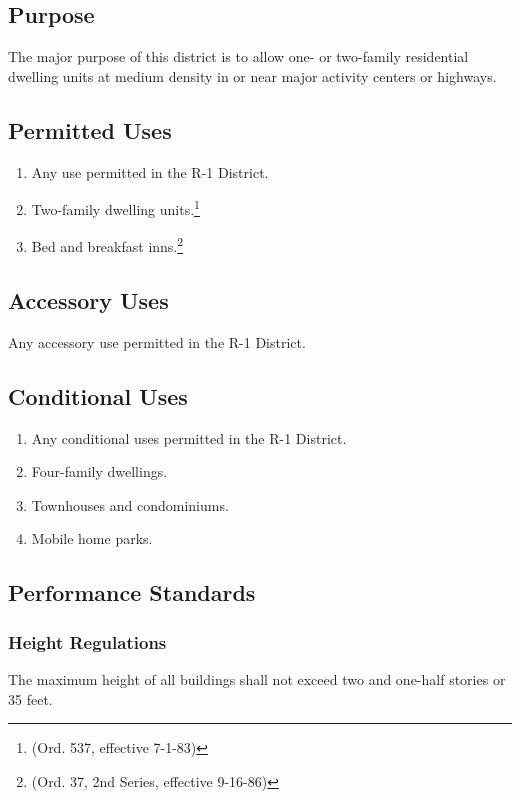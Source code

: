 \subsection{Purpose}
The major purpose of this district is to allow one- or two-family residential dwelling units at medium density in or near major activity centers or highways.
\subsection{Permitted Uses}
\begin{enumerate}[{\indent}1)]
    \item Any use permitted in the R-1 District.  
    \item Two-family dwelling units.\footnote{(Ord. 537, effective 7-1-83)}
    \item Bed and breakfast inns.\footnote{(Ord. 37, 2nd Series, effective 9-16-86)}
\end{enumerate}
\subsection{Accessory Uses}
Any accessory use permitted in the R-1 District.
\subsection{Conditional Uses}
\begin{enumerate}[{\indent}1)]
    \item Any conditional uses permitted in the R-1 District.
    \item Four-family dwellings.
    \item Townhouses and condominiums.  
    \item Mobile home parks.
\end{enumerate}
\subsection{Performance Standards}
\subsubsection{Height Regulations}
The maximum height of all buildings shall not exceed two and one-half stories or 35 feet.
